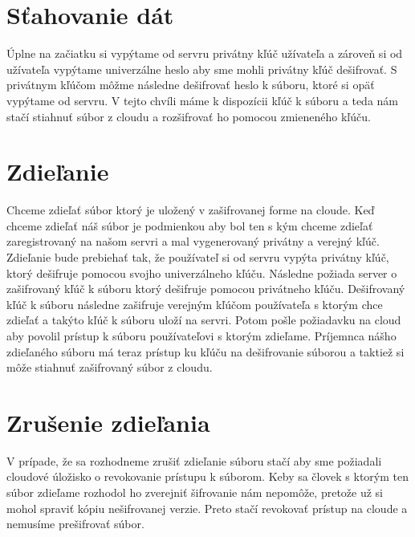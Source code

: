 	\section{Sťahovanie dát}
	
		Úplne na začiatku si vypýtame od servru privátny kľúč užívateľa a zároveň si od užívateľa vypýtame univerzálne heslo aby sme mohli privátny kľúč dešifrovať. S privátnym kľúčom môžme následne dešifrovať heslo k súboru, ktoré si opäť vypýtame od servru. V tejto chvíli máme k dispozícii kľúč k súboru a teda nám stačí stiahnuť súbor z cloudu a rozšifrovať ho pomocou zmieneného kľúču. 
	
	\section{Zdieľanie}
	
		Chceme zdieľať súbor ktorý je uložený v zašifrovanej forme na cloude. Keď chceme zdieľať náš súbor je podmienkou aby bol ten s kým chceme zdieľať zaregistrovaný na našom servri a mal vygenerovaný privátny a verejný kľúč. Zdieľanie bude prebiehať tak, že používateľ si od servru vypýta privátny kľúč, ktorý dešifruje pomocou svojho univerzálneho kľúču. Následne požiada server o zašifrovaný kľúč k súboru ktorý dešifruje pomocou privátneho kľúču. Dešifrovaný kľúč k súboru následne zašifruje verejným kľúčom používateľa s ktorým chce zdieľať a takýto kľúč k súboru uloží na servri. Potom pošle požiadavku na cloud aby povolil prístup k súboru používateľovi s ktorým zdieľame. Príjemnca nášho zdieľaného súboru má teraz prístup ku kľúču na dešifrovanie súborou a taktiež si môže stiahnuť zašifrovaný súbor z cloudu.
		
	\section{Zrušenie zdieľania}
	
		V prípade, že sa rozhodneme zrušiť zdieľanie súboru stačí aby sme požiadali cloudové úložisko o revokovanie prístupu k súborom. Keby sa človek s ktorým ten súbor zdieľame rozhodol ho zverejniť šifrovanie nám nepomôže, pretože už si mohol spraviť kópiu nešifrovanej verzie. Preto stačí revokovať prístup na cloude a nemusíme prešifrovať súbor.
	
			
			
			
